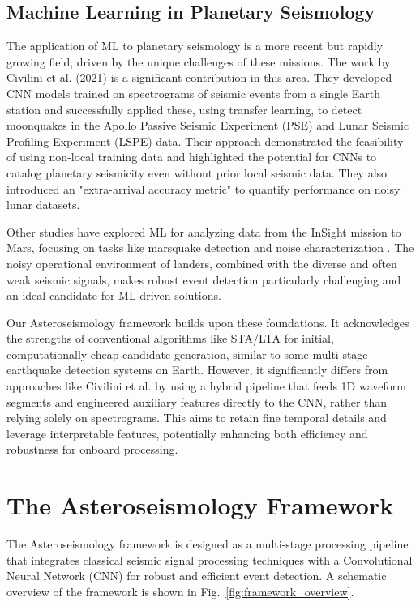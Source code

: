 \documentclass[conference]{IEEEtran}
\begin{document}
\subsection{Machine Learning in Planetary Seismology}
The application of ML to planetary seismology is a more recent but rapidly growing field, driven by the unique challenges of these missions. The work by Civilini et al. (2021) \cite{favPaper} is a significant contribution in this area. They developed CNN models trained on spectrograms of seismic events from a single Earth station and successfully applied these, using transfer learning, to detect moonquakes in the Apollo Passive Seismic Experiment (PSE) and Lunar Seismic Profiling Experiment (LSPE) data. Their approach demonstrated the feasibility of using non-local training data and highlighted the potential for CNNs to catalog planetary seismicity even without prior local seismic data. They also introduced an "extra-arrival accuracy metric" to quantify performance on noisy lunar datasets.

Other studies have explored ML for analyzing data from the InSight mission to Mars, focusing on tasks like marsquake detection and noise characterization \cite{b21}. The noisy operational environment of landers, combined with the diverse and often weak seismic signals, makes robust event detection particularly challenging and an ideal candidate for ML-driven solutions.

Our Asteroseismology framework builds upon these foundations. It acknowledges the strengths of conventional algorithms like STA/LTA for initial, computationally cheap candidate generation, similar to some multi-stage earthquake detection systems on Earth. However, it significantly differs from approaches like Civilini et al. \cite{favPaper} by using a hybrid pipeline that feeds 1D waveform segments and engineered auxiliary features directly to the CNN, rather than relying solely on spectrograms. This aims to retain fine temporal details and leverage interpretable features, potentially enhancing both efficiency and robustness for onboard processing.

\section{The Asteroseismology Framework}
\label{sec:methodology}
The Asteroseismology framework is designed as a multi-stage processing pipeline that integrates classical seismic signal processing techniques with a Convolutional Neural Network (CNN) for robust and efficient event detection. A schematic overview of the framework is shown in Fig.~\ref{fig:framework_overview}.
\end{document}
